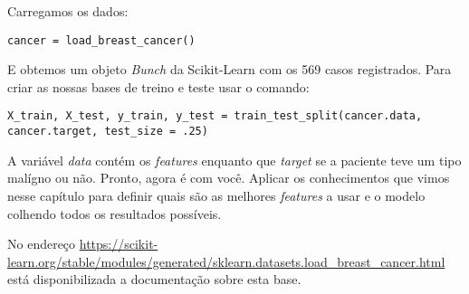 Carregamos os dados:
\begin{lstlisting}
cancer = load_breast_cancer()
\end{lstlisting}

E obtemos um objeto \textit{Bunch} da Scikit-Learn com os 569 casos registrados. Para criar as nossas bases de treino e teste usar o comando:
\begin{lstlisting}
X_train, X_test, y_train, y_test = train_test_split(cancer.data, cancer.target, test_size = .25)
\end{lstlisting}

A variável \textit{data} contém os \textit{features} enquanto que \textit{target} se a paciente teve um tipo malígno ou não. Pronto, agora é com você. Aplicar os conhecimentos que vimos nesse capítulo para definir quais são as melhores \textit{features} a usar e o modelo colhendo todos os resultados possíveis.

No endereço \url{https://scikit-learn.org/stable/modules/generated/sklearn.datasets.load_breast_cancer.html} está disponibilizada a documentação sobre esta base.